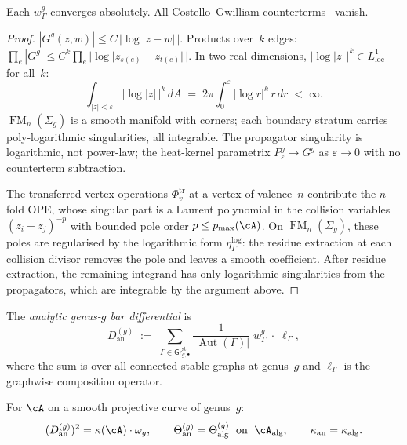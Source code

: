 \begin{proposition}
\label{prop:2d-convergence}
Each $w_\Gamma^g$ converges absolutely.
All Costello--Gwilliam
counterterms~\cite{CG17,costello-renormalization} vanish.
\end{proposition}

\begin{proof}
$|G^g(z,w)| \leq C\,|\!\log|z{-}w|\,|$.
Products over~$k$ edges:
$\prod_e |G^g| \leq C^k \prod_e
|\!\log|z_{s(e)}{-}z_{t(e)}|\,|$.
In two real dimensions,
$|\!\log|z|\,|^k \in L^1_{\mathrm{loc}}$ for all~$k$:
\[
\int_{|z|<\varepsilon}|\!\log|z|\,|^k\,dA
\;=\; 2\pi\int_0^\varepsilon|\!\log r|^k\,r\,dr
\;<\;\infty.
\]
$\operatorname{FM}_n(\Sigma_g)$ is a smooth manifold with corners;
each boundary stratum carries poly-logarithmic singularities,
all integrable.  The propagator singularity is logarithmic,
not power-law; the heat-kernel parametrix
$P_\varepsilon^g \to G^g$ as $\varepsilon \to 0$ with no
counterterm subtraction.

The transferred vertex operations $\Phi_v^{\mathrm{tr}}$ at a vertex
of valence~$n$ contribute the $n$-fold OPE, whose singular part is a
Laurent polynomial in the collision variables
$(z_i - z_j)^{-p}$ with bounded pole order $p \leq p_{\max}(\cA)$.
On $\operatorname{FM}_n(\Sigma_g)$, these poles are regularised by the
logarithmic form $\eta^{\log}_\Gamma$: the residue extraction at each
collision divisor removes the pole and leaves a smooth coefficient.
After residue extraction, the remaining integrand has only logarithmic
singularities from the propagators, which are integrable by the
argument above.
\end{proof}

\begin{definition}
\label{def:analytic-genus-g-bar}
The \emph{analytic genus-$g$ bar differential} is
\begin{equation}\label{eq:analytic-genus-g-bar}
D_{\mathrm{an}}^{(g)}
\;:=\;
\sum_{\Gamma \in \mathsf{Gr}^{\mathrm{st}}_{g,\bullet}}
\frac{1}{|\operatorname{Aut}(\Gamma)|}
\;w_\Gamma^g
\;\cdot\;
\ell_\Gamma,
\end{equation}
where the sum is over all connected stable graphs at genus~$g$ and
$\ell_\Gamma$ is the graphwise composition operator.
\end{definition}

\begin{theorem}[Analytic = algebraic; \ClaimStatusProvedHere]
\label{thm:analytic-algebraic-comparison}
For $\cA$ on a smooth projective curve of genus~$g$:
\begin{equation}\label{eq:comparison-identity}
(D_{\mathrm{an}}^{(g)})^2 = \kappa(\cA) \cdot \omega_g,
\qquad
\Theta_{\mathrm{an}}^{(g)} = \Theta_{\mathrm{alg}}^{(g)}
\;\text{ on }\; \cA_{\mathrm{alg}},
\qquad
\kappa_{\mathrm{an}} = \kappa_{\mathrm{alg}}.
\end{equation}
\end{theorem}

